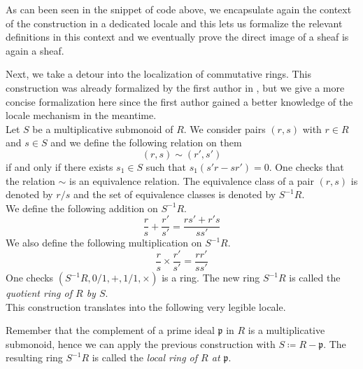 \documentclass[12pt]{scrartcl}
\begin{document}

As can been seen in the snippet of code above, we encapsulate again the context of the construction in a dedicated locale and this lets us formalize the relevant definitions in this context and we eventually prove the direct image of a sheaf is again a sheaf. 

Next, we take a detour into the localization of commutative rings. This construction was already formalized by the first author in \cite{bordg18}, but we give a more concise formalization here since the first author gained a better knowledge of the locale mechanism in the meantime. \\
Let $S$ be a multiplicative submonoid of $R$. We consider pairs $(r, s)$ with $r \in R$ and $s \in S$ and we define the following relation on them
	\[
	(r, s) \sim (r', s')
	\]
if and only if there exists $s_1 \in S$ such that $s_1(s' r - s r') = 0$. One checks that the relation $\sim$ is an equivalence relation. The equivalence class of a pair $(r, s)$ is denoted by $r/s$ and the set of equivalence classes is denoted by $S^{-1} R$. \\
We define the following addition on $S^{-1} R$.
	\[
	\frac{r}{s} + \frac{r'}{s'} = \frac{r s' + r' s}{s s'}
	\]
We also define the following multiplication on $S^{-1} R$. 
	\[
	\frac{r}{s} \times \frac{r'}{s'} = \frac{r r'}{s s'}
	\]
One checks $(S^{-1} R, 0/1, +, 1/1, \times)$ is a ring. The new ring $S^{-1} R$ is called the \emph{quotient ring of $R$ by $S$}. \\
This construction translates into the following very legible locale.


Remember that the complement of a prime ideal $\mathfrak{p}$ in $R$ is a multiplicative submonoid, hence we can apply the previous construction with $S \coloneqq R - \mathfrak{p}$. The resulting ring  $S^{-1} R$ is called the \emph{local ring of $R$ at $\mathfrak{p}$}. \\

\end{document}

